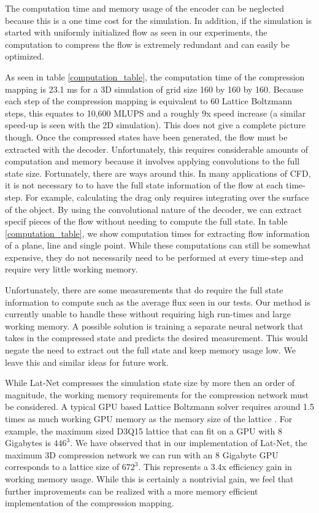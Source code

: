 \documentclass{article}
\begin{document}
The computation time and memory usage of the encoder can be neglected because this is a one time cost for the simulation. In addition, if the simulation is started with uniformly initialized flow as seen in our experiments, the computation to compress the flow is extremely redundant and can easily be optimized.

As seen in table \ref{computation_table}, the computation time of the compression mapping is 23.1 ms for a 3D simulation of grid size 160 by 160 by 160. Because each step of the compression mapping is equivalent to 60 Lattice Boltzmann steps, this equates to 10,600 MLUPS and a roughly 9x speed increase (a similar speed-up is seen with the 2D simulation). This does not give a complete picture though. Once the compressed states have been generated, the flow must be extracted with the decoder. Unfortunately, this requires considerable amounts of computation and memory because it involves applying convolutions to the full state size. Fortunately, there are ways around this. In many applications of CFD, it is not necessary to to have the full state information of the flow at each time-step. For example, calculating the drag only requires integrating over the surface of the object. By using the convolutional nature of the decoder, we can extract specif pieces of the flow without needing to compute the full state. In table \ref{computation_table}, we show computation times for extracting flow information of a plane, line and single point. While these computations can still be somewhat expensive, they do not necessarily need to be performed at every time-step and require very little working memory. 

Unfortunately, there are some measurements that do require the full state information to compute such as the average flux seen in our tests. Our method is currently unable to handle these without requiring high run-times and large working memory. A possible solution is training a separate neural network that takes in the compressed state and predicts the desired measurement. This would negate the need to extract out the full state and keep memory usage low. We leave this and similar ideas for future work.

While Lat-Net compresses the simulation state size by more then an order of magnitude, the working memory requirements for the compression network must be considered. A typical GPU based Lattice Boltzmann solver requires around 1.5 times as much working GPU memory as the memory size of the lattice \cite{januszewski2014sailfish}. For example, the maximum sized D3Q15 lattice that can fit on a GPU with 8 Gigabytes is $446^3$. We have observed that in our implementation of Lat-Net, the maximum 3D compression network we can run with an 8 Gigabyte GPU corresponds to a lattice size of $672^3$. This represents a 3.4x efficiency gain in working memory usage. While this is certainly a nontrivial gain, we feel that further improvements can be realized with a more memory efficient implementation of the compression mapping.
\end{document}
